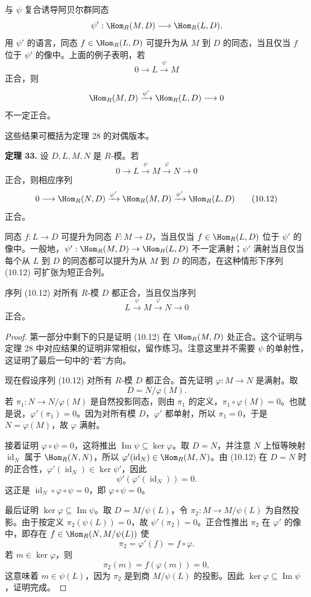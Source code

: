与 $\psi$ 复合诱导阿贝尔群同态
\[
\psi':\Hom_R(M,D)\longrightarrow\Hom_R(L,D),
\]
用 $\psi'$ 的语言，同态 $f\in\Hom_R(L,D)$ 可提升为从 $M$ 到 $D$ 的同态，当且仅当 $f$ 位于 $\psi'$ 的像中。上面的例子表明，若
\[
0\longrightarrow L\xrightarrow{\psi}M
\]
正合，则
\[
\Hom_R(M,D)\xrightarrow{\psi'}\Hom_R(L,D)\longrightarrow0
\]
不一定正合。

这些结果可概括为定理 28 的对偶版本。

\noindent\textbf{定理 33.} 设 $D,L,M,N$ 是 $R$-模。若
\[
0\longrightarrow L\xrightarrow{\psi}M\xrightarrow{\varphi}N\longrightarrow0
\]
正合，则相应序列
\[
0\longrightarrow\Hom_R(N,D)\xrightarrow{\varphi'}\Hom_R(M,D)\xrightarrow{\psi'}\Hom_R(L,D)
\tag{10.12}
\]
正合。

同态 $f:L\to D$ 可提升为同态 $F:M\to D$，当且仅当 $f\in\Hom_R(L,D)$ 位于 $\psi'$ 的像中。一般地，$\psi':\Hom_R(M,D)\to\Hom_R(L,D)$ 不一定满射；$\psi'$ 满射当且仅当每个从 $L$ 到 $D$ 的同态都可以提升为从 $M$ 到 $D$ 的同态，在这种情形下序列 (10.12) 可扩张为短正合列。

序列 (10.12) 对所有 $R$-模 $D$ 都正合，当且仅当序列
\[
L\xrightarrow{\psi}M\xrightarrow{\varphi}N\longrightarrow0
\]
正合。

\begin{proof}
第一部分中剩下的只是证明 (10.12) 在 $\Hom_R(M,D)$ 处正合。这个证明与定理 28 中对应结果的证明非常相似，留作练习。注意这里并不需要 $\psi$ 的单射性，这证明了最后一句中的“若”方向。

现在假设序列 (10.12) 对所有 $R$-模 $D$ 都正合。首先证明 $\varphi:M\to N$ 是满射。取
\[
D=N/\varphi(M).
\]
若 $\pi_1:N\to N/\varphi(M)$ 是自然投影同态，则由 $\pi_1$ 的定义，$\pi_1\circ\varphi(M)=0$。也就是说，$\varphi'(\pi_1)=0$。因为对所有模 $D$，$\varphi'$ 都单射，所以 $\pi_1=0$，于是 $N=\varphi(M)$，故 $\varphi$ 满射。

接着证明 $\varphi\circ\psi=0$，这将推出 $\operatorname{Im}\psi\subseteq\ker\varphi$。取 $D=N$，并注意 $N$ 上恒等映射 $\operatorname{id}_N$ 属于 $\Hom_R(N,N)$，所以 $\varphi'(\operatorname{id}_N)\in\Hom_R(M,N)$。由 (10.12) 在 $D=N$ 时的正合性，$\varphi'(\operatorname{id}_N)\in\ker\psi'$，因此
\[
\psi'(\varphi'(\operatorname{id}_N))=0.
\]
这正是 $\operatorname{id}_N\circ\varphi\circ\psi=0$，即 $\varphi\circ\psi=0$。

最后证明 $\ker\varphi\subseteq\operatorname{Im}\psi$。取 $D=M/\psi(L)$，令 $\pi_2:M\to M/\psi(L)$ 为自然投影。由于按定义 $\pi_2(\psi(L))=0$，故 $\psi'(\pi_2)=0$。正合性推出 $\pi_2$ 在 $\varphi'$ 的像中，即存在 $f\in\Hom_R(N,M/\psi(L))$ 使
\[
\pi_2=\varphi'(f)=f\circ\varphi.
\]
若 $m\in\ker\varphi$，则
\[
\pi_2(m)=f(\varphi(m))=0,
\]
这意味着 $m\in\psi(L)$，因为 $\pi_2$ 是到商 $M/\psi(L)$ 的投影。因此 $\ker\varphi\subseteq\operatorname{Im}\psi$，证明完成。
\end{proof}

